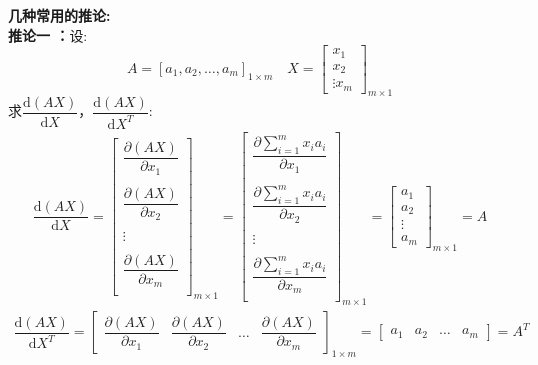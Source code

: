 \documentclass[withoutpreface,bwprint]{cumcmthesis} %
\begin{document}
	\textbf{几种常用的推论:}\\
	\textbf{推论一 ：}设:
	\begin{equation}
		A=\left[
		a_1,a_2,\ldots,a_m
		\right]_{1{\times}m} \quad X=\left[
			\begin{array}{c}
				x_1\\
				x_2\\
				\vdots
				x_m
			\end{array}
		\right]_{m{\times}1}
	\end{equation}
		求$\dfrac{\mathrm{d } (AX)}{\mathrm{d} X}$，$\dfrac{\mathrm{d } (AX)}{\mathrm{d} X^T}$:
		\begin{align}
			\dfrac{\mathrm{d } (AX)}{\mathrm{d} X}=\left[
				\begin{array}{c}
					\dfrac{\partial (AX)}{\partial x_1}\\\\
					\dfrac{\partial (AX)}{\partial x_2}\\\\
					\vdots\\\\
					\dfrac{\partial (AX)}{\partial x_m}\\		
				\end{array}
			\right]_{m{\times}1}
			=
			\left[
			\begin{array}{c}
				\dfrac{\partial \sum_{i=1}^{m}x_ia_i}{\partial x_1}\\\\
				\dfrac{\partial \sum_{i=1}^{m}x_ia_i}{\partial x_2}\\\\
				\vdots\\\\
				\dfrac{\partial \sum_{i=1}^{m}x_ia_i}{\partial x_m}\\		
			\end{array}
			\right]_{m{\times}1}
			=
			\left[
			\begin{array}{c}
				a_1\\
				a_2\\
				\vdots\\
				a_m		
			\end{array}
			\right]_{m{\times}1}=A
		\end{align}
	\begin{align}
		\dfrac{\mathrm{d } (AX)}{\mathrm{d} X^T}=\left[
		\begin{array}{cccc}
			\dfrac{\partial (AX)}{\partial x_1}&\dfrac{\partial (AX)}{\partial x_2}&\ldots&\dfrac{\partial (AX)}{\partial x_m}
		\end{array}
		\right]_{1{\times}m}=\left[
			\begin{array}{cccc}
				a_1 & a_2 & \ldots & a_m
			\end{array}
		\right]=A^T
	\end{align}
\end{document}
